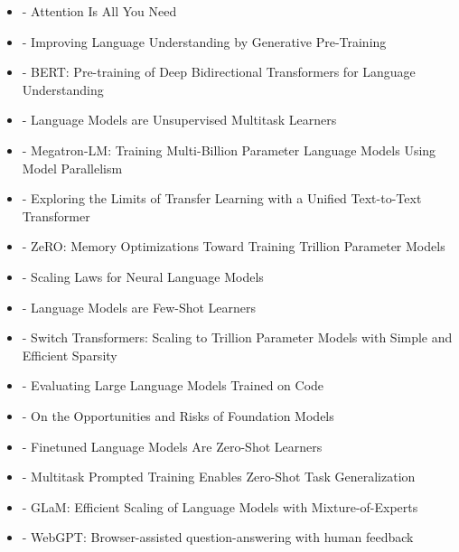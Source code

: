 \documentclass[
  letterpaper,
  DIV=11,
  numbers=noendperiod]{scrartcl}
\providecommand{\tightlist}{%
  \setlength{\itemsep}{0pt}\setlength{\parskip}{0pt}}
\begin{document}
\begin{itemize}
\tightlist
\item
  \autocite{vaswani2023attentionneed} - Attention Is All You Need
\item
  \autocite{Radford2018ImprovingLU} - Improving Language Understanding
  by Generative Pre-Training
\item
  \autocite{devlin2019bertpretrainingdeepbidirectional} - BERT:
  Pre-training of Deep Bidirectional Transformers for Language
  Understanding
\item
  \autocite{Radford2019LanguageMA} - Language Models are Unsupervised
  Multitask Learners
\item
  \autocite{shoeybi2020megatronlmtrainingmultibillionparameter} -
  Megatron-LM: Training Multi-Billion Parameter Language Models Using
  Model Parallelism
\item
  \autocite{JMLR:v21:20-074} - Exploring the Limits of Transfer Learning
  with a Unified Text-to-Text Transformer
\item
  \autocite{rajbhandari2020zeromemoryoptimizationstraining} - ZeRO:
  Memory Optimizations Toward Training Trillion Parameter Models
\item
  \autocite{kaplan2020scalinglawsneurallanguage} - Scaling Laws for
  Neural Language Models
\item
  \autocite{brown2020languagemodelsfewshotlearners} - Language Models
  are Few-Shot Learners
\item
  \autocite{fedus2022switchtransformersscalingtrillion} - Switch
  Transformers: Scaling to Trillion Parameter Models with Simple and
  Efficient Sparsity
\item
  \autocite{chen2021evaluatinglargelanguagemodels} - Evaluating Large
  Language Models Trained on Code
\item
  \autocite{bommasani2022opportunitiesrisksfoundationmodels} - On the
  Opportunities and Risks of Foundation Models
\item
  \autocite{wei2022finetunedlanguagemodelszeroshot} - Finetuned Language
  Models Are Zero-Shot Learners
\item
  \autocite{sanh2022multitaskpromptedtrainingenables} - Multitask
  Prompted Training Enables Zero-Shot Task Generalization
\item
  \autocite{du2022glamefficientscalinglanguage} - GLaM: Efficient
  Scaling of Language Models with Mixture-of-Experts
\item
  \autocite{Nakano2021WebGPTBQ} - WebGPT: Browser-assisted
  question-answering with human feedback

\end{itemize}
\end{document}

